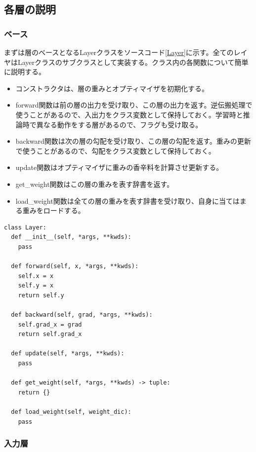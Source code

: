 \documentclass[platex,dvipdfmx]{jsarticle}
\begin{document}
\subsection{各層の説明}

\subsubsection{ベース}

まずは層のベースとなるLayerクラスをソースコード\ref{Layer}に示す。全てのレイヤはLayerクラスのサブクラスとして実装する。クラス内の各関数について簡単に説明する。

\begin{itemize}
  \item コンストラクタは、層の重みとオプティマイザを初期化する。
  \item forward関数は前の層の出力を受け取り、この層の出力を返す。逆伝搬処理で使うことがあるので、入出力をクラス変数として保持しておく。学習時と推論時で異なる動作をする層があるので、フラグも受け取る。
  \item backward関数は次の層の勾配を受け取り、この層の勾配を返す。重みの更新で使うことがあるので、勾配をクラス変数として保持しておく。
  \item update関数はオプティマイザに重みの香辛料を計算させ更新する。
  \item get\_weight関数はこの層の重みを表す辞書を返す。
  \item load\_weight関数は全ての層の重みを表す辞書を受け取り、自身に当てはまる重みをロードする。
\end{itemize}

\begin{lstlisting}[caption=ex\_advanced.py, label=Layer]
class Layer:
  def __init__(self, *args, **kwds):
    pass

  def forward(self, x, *args, **kwds):
    self.x = x
    self.y = x
    return self.y

  def backward(self, grad, *args, **kwds):
    self.grad_x = grad
    return self.grad_x

  def update(self, *args, **kwds):
    pass

  def get_weight(self, *args, **kwds) -> tuple:
    return {}

  def load_weight(self, weight_dic):
    pass
\end{lstlisting}

\newpage

\subsubsection{入力層}
\end{document}
